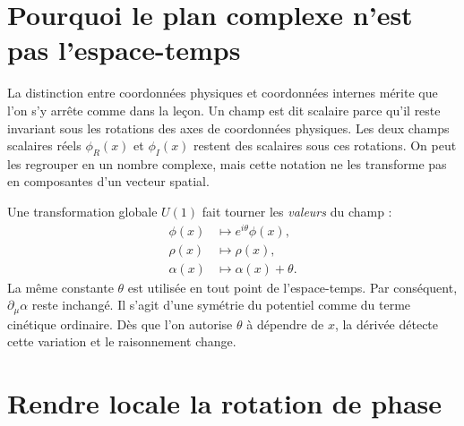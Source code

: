 \begin{classroomqa}\end{classroomqa}

\section{Pourquoi le plan complexe n’est pas l’espace-temps}

La distinction entre coordonnées physiques et coordonnées internes mérite que l’on s’y arrête comme dans la leçon. Un champ est dit scalaire parce qu’il reste invariant sous les rotations des axes de coordonnées physiques. Les deux champs scalaires réels \(\phi_R(x)\) et \(\phi_I(x)\) restent des scalaires sous ces rotations. On peut les regrouper en un nombre complexe, mais cette notation ne les transforme pas en composantes d’un vecteur spatial.

Une transformation globale \(U(1)\) fait tourner les \emph{valeurs} du champ :
\begin{equation}
\begin{aligned}
  \phi(x)&\longmapsto e^{i\theta}\phi(x),
  \\
  \rho(x)&\longmapsto\rho(x),
  \\
  \alpha(x)&\longmapsto\alpha(x)+\theta.
\end{aligned}
  \label{eq:l08-global-shift}
\end{equation}
La même constante \(\theta\) est utilisée en tout point de l’espace-temps. Par conséquent, \(\partial_\mu\alpha\) reste inchangé. Il s’agit d’une symétrie du potentiel comme du terme cinétique ordinaire. Dès que l’on autorise \(\theta\) à dépendre de \(x\), la dérivée détecte cette variation et le raisonnement change.

\section{Rendre locale la rotation de phase}

